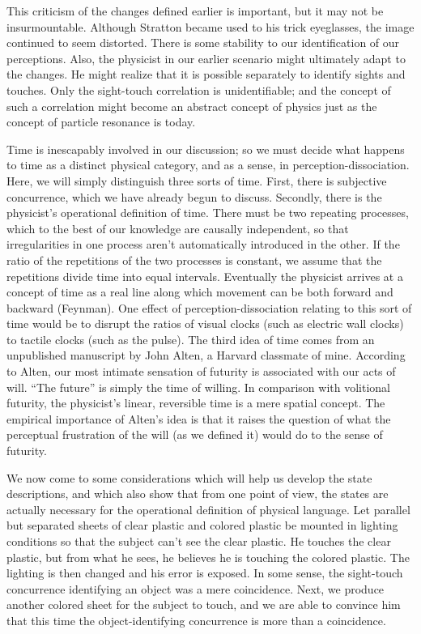 This criticism of the changes defined earlier is important, but it may not be insurmountable. Although Stratton became used to his trick eyeglasses, the image continued to seem distorted. There is some stability to our identification of our perceptions. Also, the physicist in our earlier scenario might ultimately adapt to the changes. He might realize that it is possible separately to identify sights and touches. Only the sight-touch correlation is unidentifiable; and the concept of such a correlation might become an abstract concept of physics just as the concept of particle resonance is today. 

Time is inescapably involved in our discussion; so we must decide what happens to time as a distinct physical category, and as a sense, in perception-dissociation. Here, we will simply distinguish three sorts of time. First, there is subjective concurrence, which we have already begun to discuss. Secondly, there is the physicist's operational definition of time. There must be two repeating processes, which to the best of our knowledge are causally independent, so that irregularities in one process aren't automatically introduced in the other. If the ratio of the repetitions of the two processes is constant, we assume that the repetitions divide time into equal intervals. Eventually the physicist arrives at a concept of time as a real line along which movement can be both forward and backward (Feynman). One effect of perception-dissociation relating to this sort of time would be to disrupt the ratios of visual clocks (such as electric wall clocks) to tactile clocks (such as the pulse). The third idea of time comes from an unpublished manuscript by John Alten, a Harvard classmate of mine. According to Alten, our most intimate sensation of futurity is associated with our acts of will. \enquote{The future} is simply the time of willing. In comparison with volitional futurity, the physicist's linear, reversible time is a mere spatial concept. The empirical importance of Alten's idea is that it raises the question of what the perceptual frustration of the will (as we defined it) would do to the sense of futurity. 

\visbreak

We now come to some considerations which will help us develop the state descriptions, and which also show that from one point of view, the states are actually necessary for the operational definition of physical language. Let parallel but separated sheets of clear plastic and colored plastic be mounted in lighting conditions so that the subject can't see the clear plastic. He touches the clear plastic, but from what he sees, he believes he is touching the colored plastic. The lighting is then changed and his error is exposed. In some sense, the sight-touch concurrence identifying an object was a mere coincidence. Next, we produce another colored sheet for the subject to touch, and we are able to convince him that this time the object-identifying concurrence is more than a coincidence. 

